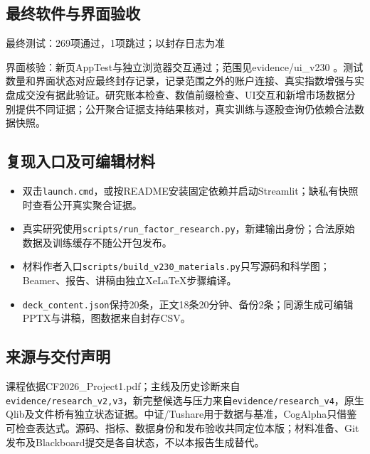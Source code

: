 \documentclass[UTF8,a4paper,10pt]{ctexart}
\begin{document}
\subsection*{最终软件与界面验收}
最终测试：269项通过，1项跳过；以封存日志为准

界面核验：新页AppTest与独立浏览器交互通过；范围见evidence/ui\_v230
。测试数量和界面状态对应最终封存记录，记录范围之外的账户连接、真实指数增强与实盘成交没有据此验证。研究账本检查、数值前缀检查、UI交互和新增市场数据分别提供不同证据；公开聚合证据支持结果核对，真实训练与逐股查询仍依赖合法数据快照。
\subsection*{复现入口及可编辑材料}
\begin{itemize}
\item 双击\texttt{launch.cmd}，或按README安装固定依赖并启动Streamlit；缺私有快照时查看公开真实聚合证据。
\item 真实研究使用\texttt{scripts/run\_factor\_research.py}，新建输出身份；合法原始数据及训练缓存不随公开包发布。
\item 材料作者入口\texttt{scripts/build\_v230\_materials.py}只写源码和科学图；Beamer、报告、讲稿由独立XeLaTeX步骤编译。
\item \texttt{deck\_content.json}保持20条，正文18条20分钟、备份2条；同源生成可编辑PPTX与讲稿，图数据来自封存CSV。
\end{itemize}
\subsection*{来源与交付声明}
课程依据CF2026\_Project1.pdf；主线及历史诊断来自\texttt{evidence/research\_v2,v3}，新完整候选与压力来自\texttt{evidence/research\_v4}，原生Qlib及文件桥有独立状态证据。中证/Tushare用于数据与基准，CogAlpha只借鉴可检查表达式。源码、指标、数据身份和发布验收共同定位本版；材料准备、Git发布及Blackboard提交是各自状态，不以本报告生成替代。
\end{document}
